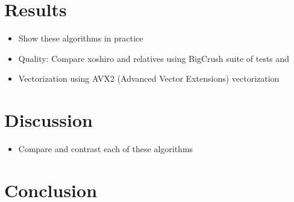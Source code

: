 \documentclass{article}
\begin{document}
    \section*{Results}

        \begin{itemize}
            \item Show these algorithms in practice
            \item Quality\cite{Shootout}: Compare xoshiro and relatives using BigCrush suite of tests\cite{TestU01} and\cite{HammingWeightDependencies}
            \item Vectorization using AVX2 (Advanced Vector Extensions) vectorization\cite{Shootout}
        \end{itemize}

    \section*{Discussion}

        \begin{itemize}
            \item Compare and contrast each of these algorithms
        \end{itemize}

    \section*{Conclusion}
    
    \newpage
    \printbibliography
\end{document}
